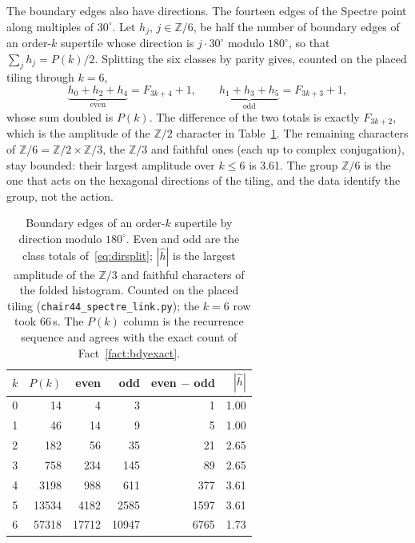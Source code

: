\documentclass[11pt]{article}
\theoremstyle{definition}
\theoremstyle{remark}
\newcommand{\code}[1]{\texttt{#1}}
\begin{document}
The boundary edges also have directions.  The fourteen edges of the Spectre
point along multiples of $30^{\circ}$.  Let $h_{j}$, $j\in\mathbb{Z}/6$, be half the number of
boundary edges of an order-$k$ supertile whose direction is $j\cdot30^{\circ}$ modulo
$180^{\circ}$, so that $\sum_{j}h_{j}=P(k)/2$.  Splitting the six classes by parity gives,
counted on the placed tiling through $k=6$,
%
\begin{equation}
\label{eq:dirsplit}
\underbrace{h_{0}+h_{2}+h_{4}}_{\text{even}}=F_{3k+4}+1,
\qquad
\underbrace{h_{1}+h_{3}+h_{5}}_{\text{odd}}=F_{3k+3}+1,
\end{equation}
%
whose sum doubled is $P(k)$.  The difference of the two totals is exactly
$F_{3k+2}$, which is the amplitude of the $\mathbb{Z}/2$ character in
Table~\ref{tab:dirs}.  The remaining characters of
$\mathbb{Z}/6=\mathbb{Z}/2\times\mathbb{Z}/3$, the $\mathbb{Z}/3$ and faithful ones (each up to complex conjugation), stay bounded:
their largest amplitude over $k\le6$ is 3.61.  The group $\mathbb{Z}/6$ is the one that acts on the hexagonal directions of the tiling, and the data identify the group, not the action.

\begin{table}[h]
\centering
\caption{Boundary edges of an order-$k$ supertile by direction modulo
$180^{\circ}$.  Even and odd are the class totals of~\eqref{eq:dirsplit};
$|\hat h|$ is the largest amplitude of the $\mathbb{Z}/3$ and faithful
characters of the folded histogram.  Counted on the placed tiling
(\code{chair44\_spectre\_link.py}); the $k=6$ row took 66\,s.  The $P(k)$ column is the recurrence sequence and agrees
with the exact count of Fact~\ref{fact:bdyexact}.}
\label{tab:dirs}
\begin{tabular}{rrrrrr}
\toprule
$k$ & $P(k)$ & even & odd & even $-$ odd & $|\hat h|$ \\
\midrule
0 & 14 & 4 & 3 & 1 & 1.00 \\
1 & 46 & 14 & 9 & 5 & 1.00 \\
2 & 182 & 56 & 35 & 21 & 2.65 \\
3 & 758 & 234 & 145 & 89 & 2.65 \\
4 & 3198 & 988 & 611 & 377 & 3.61 \\
5 & 13534 & 4182 & 2585 & 1597 & 3.61 \\
6 & 57318 & 17712 & 10947 & 6765 & 1.73 \\
\bottomrule
\end{tabular}
\end{table}
\end{document}
